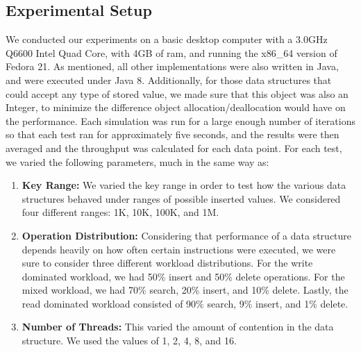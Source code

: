 \documentclass[conference]{IEEEtran}
\begin{document}
\subsection{Experimental Setup}
We conducted our experiments on a basic desktop computer with a 3.0GHz Q6600 Intel Quad Core, with 4GB of ram, and running the x86\_64 version of Fedora 21. As mentioned, all other implementations were also written in Java, and were executed under Java 8. Additionally, for those data structures that could accept any type of stored value, we made sure that this object was also an Integer, to minimize the difference object allocation/deallocation would have on the performance. Each simulation was run for a large enough number of iterations so that each test ran for approximately five seconds, and the results were then averaged and the throughput was calculated for each data point. For each test, we varied the following parameters, much in the same way as\cite{Natarajan2014}:

\begin{enumerate}
  \item \textbf{Key Range:} We varied the key range in order to test how the various data structures behaved under ranges of possible inserted values. We considered four different ranges: 1K, 10K, 100K, and 1M.
  \item \textbf{Operation Distribution:} Considering that performance of a data structure depends heavily on how often certain instructions were executed, we were sure to consider three different workload distributions. For the write dominated workload, we had 50\% insert and 50\% delete operations. For the mixed workload, we had 70\% search, 20\% insert, and 10\% delete. Lastly, the read dominated workload consisted of 90\% search, 9\% insert, and 1\% delete.
  \item \textbf{Number of Threads:} This varied the amount of contention in the data structure. We used the values of 1, 2, 4, 8, and 16.
\end{enumerate}
\end{document}
